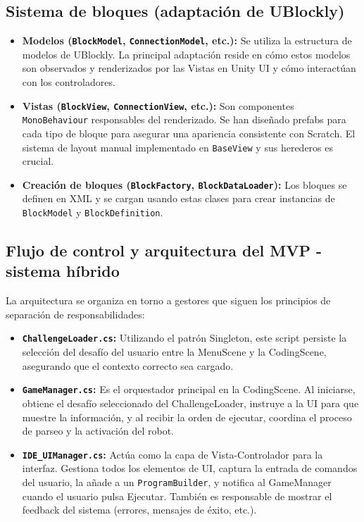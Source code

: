 \subsection{Sistema de bloques (adaptación de UBlockly)}
\begin{itemize}
	\item \textbf{Modelos (\texttt{BlockModel}, \texttt{ConnectionModel}, etc.):} Se utiliza la estructura de modelos de UBlockly. La principal adaptación reside en cómo estos modelos son observados y renderizados por las Vistas en Unity UI y cómo interactúan con los controladores.
	\item \textbf{Vistas (\texttt{BlockView}, \texttt{ConnectionView}, etc.):} Son componentes \texttt{MonoBehaviour} responsables del renderizado. Se han diseñado prefabs para cada tipo de bloque para asegurar una apariencia consistente con Scratch. El sistema de layout manual implementado en \texttt{BaseView} y sus herederos es crucial.
	\item \textbf{Creación de bloques (\texttt{BlockFactory}, \texttt{BlockDataLoader}):} Los bloques se definen en XML y se cargan usando estas clases para crear instancias de \texttt{BlockModel} y \texttt{BlockDefinition}.
\end{itemize}

\subsection{Flujo de control y arquitectura del MVP - sistema híbrido}
La arquitectura se organiza en torno a gestores que siguen los principios de separación de responsabilidades:
\begin{itemize}
	\item \textbf{\texttt{ChallengeLoader.cs}:} Utilizando el patrón Singleton, este script persiste la selección del desafío del usuario entre la MenuScene y la CodingScene, asegurando que el contexto correcto sea cargado.
	\item \textbf{\texttt{GameManager.cs}:} Es el orquestador principal en la CodingScene. Al iniciarse, obtiene el desafío seleccionado del ChallengeLoader, instruye a la UI para que muestre la información, y al recibir la orden de ejecutar, coordina el proceso de parseo y la activación del robot.
	\item \textbf{\texttt{IDE\_UIManager.cs}:} Actúa como la capa de Vista-Controlador para la interfaz. Gestiona todos los elementos de UI, captura la entrada de comandos del usuario, la añade a un \texttt{ProgramBuilder}, y notifica al GameManager cuando el usuario pulsa Ejecutar. También es responsable de mostrar el feedback del sistema (errores, mensajes de éxito, etc.).
\end{itemize}

